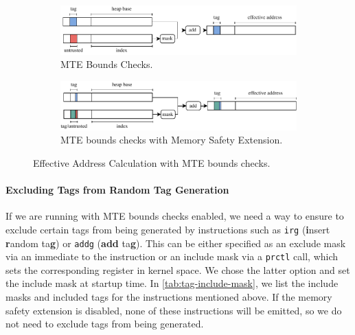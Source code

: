 \begin{figure}[t]
  \centering
  \begin{subfigure}[T]{\textwidth}
    \centering
    \includegraphics{figures/build/bounds}
    \caption{\ac{MTE} Bounds Checks.}
    \label{fig:mte-bounds-checks}
  \end{subfigure}
  \hfill
  \begin{subfigure}[T]{\textwidth}
    \centering
    \includegraphics{figures/build/bounds-mem-safety}
    \caption{\ac{MTE} bounds checks with Memory Safety Extension.}
    \label{fig:mte-bounds-checks-mem-safety}
  \end{subfigure}
  \caption{Effective Address Calculation with \ac{MTE} bounds checks.}
  \label{fig:system-design-mem-safety-bounds}
\end{figure}

\paragraph{Excluding Tags from Random Tag Generation}
If we are running with \ac{MTE} bounds checks enabled, we need a way to ensure to exclude certain tags from being generated by instructions such as \texttt{irg} (\textbf{i}nsert \textbf{r}andom ta\textbf{g}) or \texttt{addg} (\textbf{add} ta\textbf{g}).
This can be either specified as an exclude mask via an immediate to the instruction or an include mask via a \texttt{prctl} call, which sets the corresponding register in kernel space.
We chose the latter option and set the include mask at startup time.
In \cref{tab:tag-include-mask}, we list the include masks and included tags for the instructions mentioned above.
If the memory safety extension is disabled, none of these instructions will be emitted, so we do not need to exclude tags from being generated.

